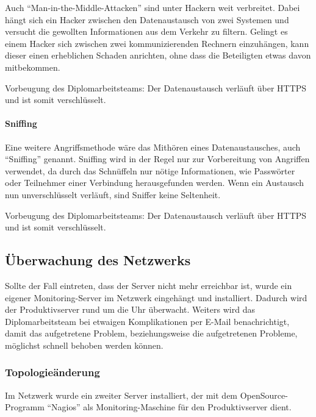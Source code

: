 \documentclass[
]{article}
\begin{document}
Auch ``Man-in-the-Middle-Attacken'' sind unter Hackern weit verbreitet.
Dabei hängt sich ein Hacker zwischen den Datenaustausch von zwei
Systemen und versucht die gewollten Informationen aus dem Verkehr zu
filtern. Gelingt es einem Hacker sich zwischen zwei kommunizierenden
Rechnern einzuhängen, kann dieser einen erheblichen Schaden anrichten,
ohne dass die Beteiligten etwas davon mitbekommen.

Vorbeugung des Diplomarbeitsteams: Der Datenaustausch verläuft über
HTTPS und ist somit verschlüsselt.

\hypertarget{sniffing}{%
\paragraph{Sniffing}\label{sniffing}}

Eine weitere Angriffsmethode wäre das Mithören eines Datenaustausches,
auch ``Sniffing'' genannt. Sniffing wird in der Regel nur zur
Vorbereitung von Angriffen verwendet, da durch das Schnüffeln nur nötige
Informationen, wie Passwörter oder Teilnehmer einer Verbindung
herausgefunden werden. Wenn ein Austausch nun unverschlüsselt verläuft,
sind Sniffer keine Seltenheit.

Vorbeugung des Diplomarbeitsteams: Der Datenaustausch verläuft über
HTTPS und ist somit verschlüsselt.

\hypertarget{uxfcberwachung-des-netzwerks}{%
\subsection{Überwachung des
Netzwerks}\label{uxfcberwachung-des-netzwerks}}

Sollte der Fall eintreten, dass der Server nicht mehr erreichbar ist,
wurde ein eigener Monitoring-Server im Netzwerk eingehängt und
installiert. Dadurch wird der Produktivserver rund um die Uhr überwacht.
Weiters wird das Diplomarbeitsteam bei etwaigen Komplikationen per
E-Mail benachrichtigt, damit das aufgetretene Problem, beziehungsweise
die aufgetretenen Probleme, möglichst schnell behoben werden können.

\hypertarget{topologieuxe4nderung}{%
\subsubsection{Topologieänderung}\label{topologieuxe4nderung}}

Im Netzwerk wurde ein zweiter Server installiert, der mit dem
OpenSource-Programm ``Nagios'' als Monitoring-Maschine für den
Produktivserver dient.
\end{document}
